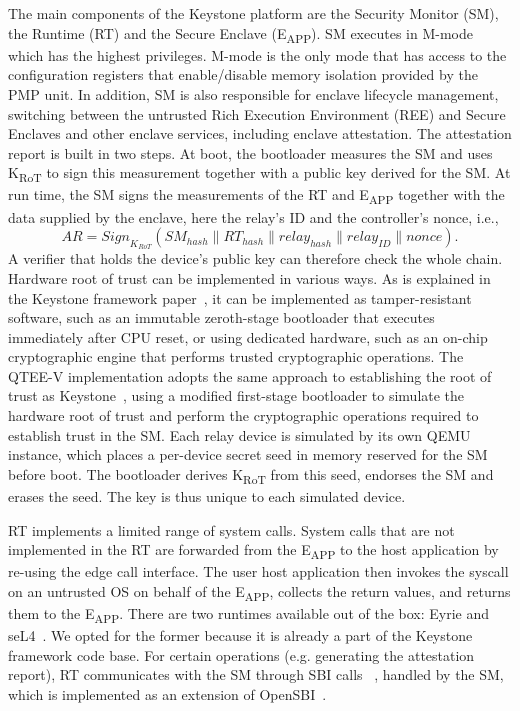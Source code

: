 \documentclass[futureinternet,article,submit,moreauthors]{Definitions/mdpi}
\begin{document}
The main components of the Keystone platform are the Security Monitor (SM), the Runtime (RT) and the Secure Enclave (E\textsubscript{APP}). SM executes in M-mode which has the highest privileges. M-mode is the only mode that has access to the configuration registers that enable/disable memory isolation provided by the PMP unit. In addition, SM is also responsible for enclave lifecycle management, switching between the untrusted Rich Execution Environment (REE) and Secure Enclaves and other enclave services, including enclave attestation. The attestation report is built in two steps. At boot, the bootloader measures the SM and uses K\textsubscript{RoT} to sign this measurement together with a public key derived for the SM. At run time, the SM signs the measurements of the RT and E\textsubscript{APP} together with the data supplied by the enclave, here the relay's ID and the controller's nonce, i.e.,
\begin{equation*}
\mathit{AR} = \mathit{Sign}_{K_{\mathit{RoT}}}\left(\mathit{SM}_{\mathit{hash}} \parallel \mathit{RT}_{\mathit{hash}} \parallel \mathit{relay}_{\mathit{hash}} \parallel \mathit{relay}_{\mathit{ID}} \parallel \mathit{nonce}\right).
\end{equation*}
A verifier that holds the device's public key can therefore check the whole chain. Hardware root of trust can be implemented in various ways. As is explained in the Keystone framework paper~\cite{lee_keystone_2020}, it can be implemented as tamper-resistant software, such as an immutable zeroth-stage bootloader that executes immediately after CPU reset, or using dedicated hardware, such as an on-chip cryptographic engine that performs trusted cryptographic operations. The QTEE-V implementation adopts the same approach to establishing the root of trust as Keystone~\cite{lee_keystone_2020}, using a modified first-stage bootloader to simulate the hardware root of trust and perform the cryptographic operations required to establish trust in the SM. Each relay device is simulated by its own QEMU instance, which places a per-device secret seed in memory reserved for the SM before boot. The bootloader derives K\textsubscript{RoT} from this seed, endorses the SM and erases the seed. The key is thus unique to each simulated device.

RT implements a limited range of system calls. System calls that are not implemented in the RT are forwarded from the E\textsubscript{APP} to the host application by re-using the edge call interface. The user host application then invokes the syscall on an untrusted OS on behalf of the E\textsubscript{APP}, collects the return values, and returns them to the E\textsubscript{APP}. There are two runtimes available out of the box: Eyrie and seL4~\cite{klein_sel4_2009}. We opted for the former because it is already a part of the Keystone framework code base. For certain operations (e.g. generating the attestation report), RT communicates with the SM through SBI calls~\cite{noauthor_risc-v_2022} , handled by the SM, which is implemented as an extension of OpenSBI~\cite{risc-v_international_opensbi_2022}.
\end{document}
